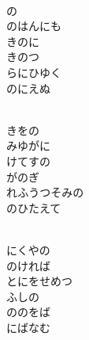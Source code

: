 \documentclass[10pt,b5j]{tarticle} %
\begin{document}
\vspace{1.5em} %
\newcommand{\linespace}{0.5em} %
\newcommand{\blocksize}{0.5\hsize} %
\newcommand{\itemmargin}{6em} %
\begin{enumerate} %
    \setlength{\itemindent}{\itemmargin} %
    \begin{minipage}[c]{\blocksize}
    
        \vspace{\linespace}
        \item~\\
        の\\
        のはんにも\\
        きのに\\
        きのつ\\
        らにひゆく\\
        のにえぬ
        
        \vspace{\linespace}
        \item~\\
        きをの\\
        みゆがに\\
        けてすの\\
        がのぎ\\
        れふうつそみの\\
        のひたえて
        
        \vspace{\linespace}
        \item~\\
        にくやの\\
        のければ\\
        とにをせめつ\\
        ふしの\\
        ののをば\\
        にばなむ
        

\end{minipage}
\end{enumerate}
\end{document}
